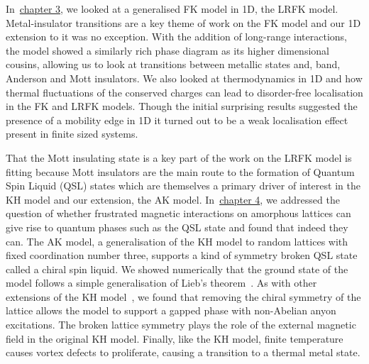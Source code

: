 In~\protect\hyperlink{chap:3-the-long-range-falicov-kimball-model}{chapter 3}, we looked at a generalised FK model in 1D, the LRFK model. Metal-insulator transitions are a key theme of work on the FK model and our 1D extension to it was no exception. With the addition of long-range interactions, the model showed a similarly rich phase diagram as its higher dimensional cousins, allowing us to look at transitions between metallic states and, band, Anderson and Mott insulators. We also looked at thermodynamics in 1D and how thermal fluctuations of the conserved charges can lead to disorder-free localisation in the FK and LRFK models. Though the initial surprising results suggested the presence of a mobility edge in 1D it turned out to be a weak localisation effect present in finite sized systems.

That the Mott insulating state is a key part of the work on the LRFK model is fitting because Mott insulators are the main route to the formation of Quantum Spin Liquid (QSL) states which are themselves a primary driver of interest in the KH model and our extension, the AK model. In~\protect\hyperlink{chap:4-the-amorphous-kitaev-model}{chapter 4}, we addressed the question of whether frustrated magnetic interactions on amorphous lattices can give rise to quantum phases such as the QSL state and found that indeed they can. The AK model, a generalisation of the KH model to random lattices with fixed coordination number three, supports a kind of symmetry broken QSL state called a chiral spin liquid. We showed numerically that the ground state of the model follows a simple generalisation of Lieb's theorem~\autocite{lieb_flux_1994,OBrienPRB2016,eschmannThermodynamicClassificationThreedimensional2020}. As with other extensions of the KH model~\autocite{yaoExactChiralSpin2007}, we found that removing the chiral symmetry of the lattice allows the model to support a gapped phase with non-Abelian anyon excitations. The broken lattice symmetry plays the role of the external magnetic field in the original KH model. Finally, like the KH model, finite temperature causes vortex defects to proliferate, causing a transition to a thermal metal state.

